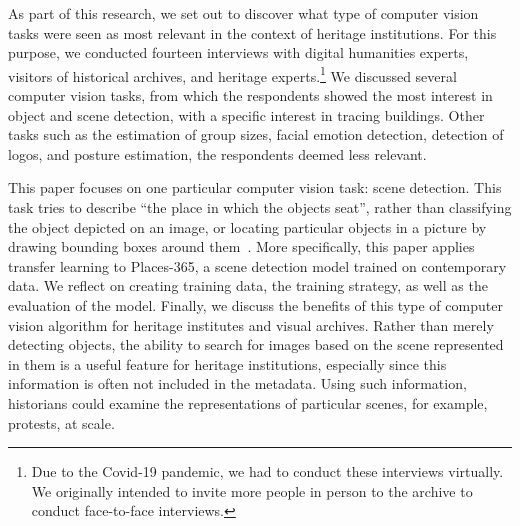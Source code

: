 \documentclass[a4paper,twoside]{article}
\begin{document}
As part of this research, we set out to discover what type of computer vision tasks were seen as most relevant in the context of heritage institutions. For this purpose, we conducted fourteen interviews with digital humanities experts, visitors of historical archives, and heritage experts.\footnote{Due to the Covid-19 pandemic, we had to conduct these interviews virtually. 
We originally intended to invite more people in person to the archive to conduct face-to-face interviews.}
We discussed several computer vision tasks, from which the respondents showed the most interest in object and scene detection, with a specific interest in tracing buildings. 
Other tasks such as the estimation of group sizes, facial emotion detection, detection of logos, and posture estimation, the respondents deemed less relevant.

This paper focuses on one particular computer vision task: scene detection. 
This task tries to describe ``the place in which the objects seat'', rather than classifying the object depicted on an image, or locating particular objects in a picture by drawing bounding boxes around them~\cite{zhou_places_2018}. 
More specifically, this paper applies transfer learning to Places-365, a scene detection model trained on contemporary data. 
We reflect on creating training data, the training strategy, as well as the evaluation of the model. 
Finally, we discuss the benefits of this type of computer vision algorithm for heritage institutes and visual archives.
Rather than merely detecting objects, the ability to search for images based on the scene represented in them is a useful feature for heritage institutions, especially since this information is often not included in the metadata. 
Using such information, historians could examine the representations of particular scenes, for example, protests, at scale. 
\end{document}
